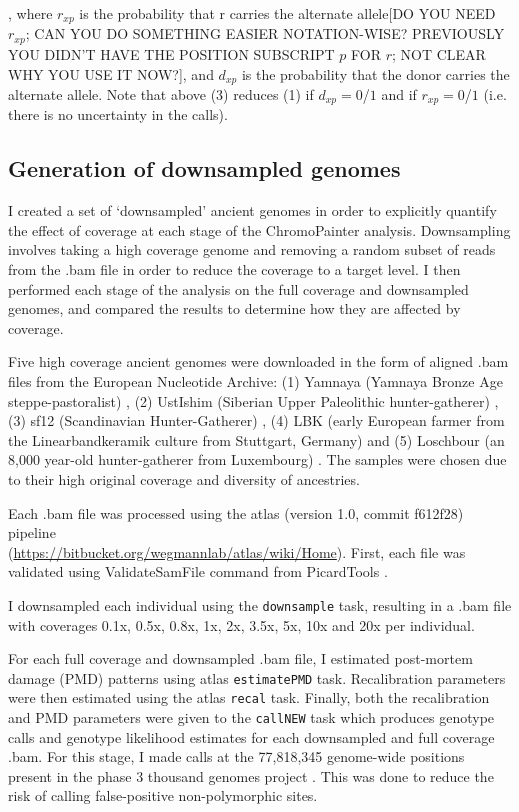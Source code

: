 , where  $r_{xp}$ is the probability that r carries the alternate allele{\color{red}[DO YOU NEED $r_{xp}$; CAN YOU DO SOMETHING EASIER NOTATION-WISE? PREVIOUSLY YOU DIDN'T HAVE THE POSITION SUBSCRIPT $p$ FOR $r$; NOT CLEAR WHY YOU USE IT NOW?]}, and $d_{xp}$ is the probability that the donor carries the alternate allele. Note that above (3) reduces (1) if $d_{xp} = 0$/$1$ and if $r_{xp} = 0$/$1$ (i.e. there is no uncertainty in the calls).


\subsection{Generation of downsampled genomes}

I created a set of `downsampled' ancient genomes in order to explicitly quantify the effect of coverage at each stage of the ChromoPainter analysis. Downsampling involves taking a high coverage genome and removing a random subset of reads from the .bam file in order to reduce the coverage to a target level. I then performed each stage of the analysis on the full coverage and downsampled genomes, and compared the results to determine how they are affected by coverage.

Five high coverage ancient genomes were downloaded in the form of aligned .bam files from the European Nucleotide Archive: (1) Yamnaya (Yamnaya Bronze Age steppe-pastoralist) \cite{deBarrosDamgaardeaar7711}, (2) UstIshim (Siberian Upper Paleolithic hunter-gatherer) \cite{Fu2014}, (3) sf12 (Scandinavian Hunter-Gatherer) \cite{Gunther2018a}, (4) LBK (early European farmer from the Linearbandkeramik culture from Stuttgart, Germany) \cite{Lazaridis2014} and (5) Loschbour (an 8,000 year-old hunter-gatherer from Luxembourg) \cite{Lazaridis2014}. The samples were chosen due to their high original coverage and diversity of ancestries. 

Each .bam file was processed using the atlas (version 1.0, commit f612f28) pipeline \cite{Link2017} \\(\url{https://bitbucket.org/wegmannlab/atlas/wiki/Home}). First, each file was validated using ValidateSamFile command from PicardTools \cite{Picard2018toolkit}. 

I downsampled each individual using the \texttt{downsample} task, resulting in a .bam file with coverages 0.1x, 0.5x, 0.8x, 1x, 2x, 3.5x, 5x, 10x and 20x per individual. 

For each full coverage and downsampled .bam file, I estimated post-mortem damage (PMD) patterns using atlas \texttt{estimatePMD} task. Recalibration parameters were then estimated using the atlas \texttt{recal} task. Finally, both the recalibration and PMD parameters were given to the \texttt{callNEW} task which produces genotype calls and genotype likelihood estimates for each downsampled and full coverage .bam. For this stage, I made calls at the 77,818,345 genome-wide positions present in the phase 3 thousand genomes project \cite{1000GenomesProjectConsortium2015}. This was done to reduce the risk of calling false-positive non-polymorphic sites.

